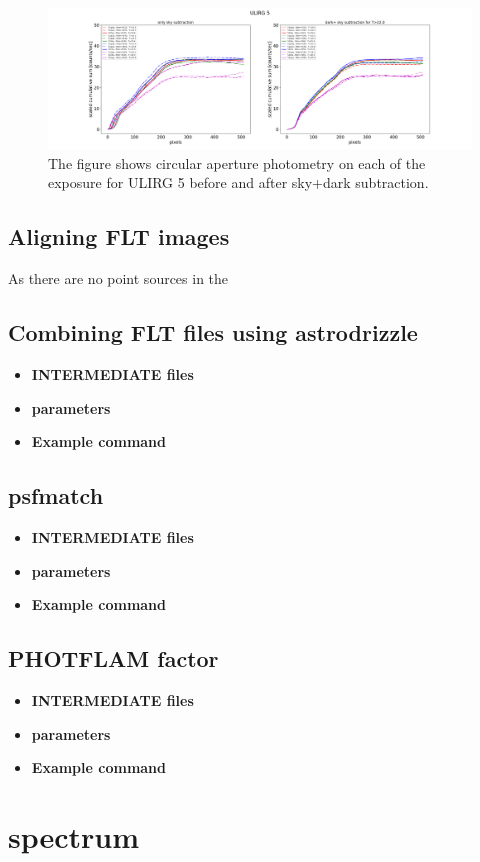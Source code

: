 \documentclass[11pt]{article}
\begin{document}
\begin{figure}
 \includegraphics[scale=0.30]{gal5_photometry_FLT_subtracted_final.png}

\caption{The figure shows circular aperture photometry on each of the exposure for ULIRG 5 before and after sky+dark subtraction. \label{fig:gal5}
 }
\end{figure}
\subsection{Aligning FLT images}
As there are no point sources in the 

\subsection{Combining FLT files using astrodrizzle}
\begin{itemize}
	\item \textbf{INTERMEDIATE files}
	\item \textbf{parameters} 
	\item \textbf{Example command}
	\end{itemize}

\subsection{psfmatch}

\begin{itemize}
	\item \textbf{INTERMEDIATE files}
	\item \textbf{parameters} 
	\item \textbf{Example command}
	\end{itemize}

\subsection{PHOTFLAM factor }

\begin{itemize}
	\item \textbf{INTERMEDIATE files}
	\item \textbf{parameters} 
	\item \textbf{Example command}
	\end{itemize}

\section{spectrum}
	
\end{document}
